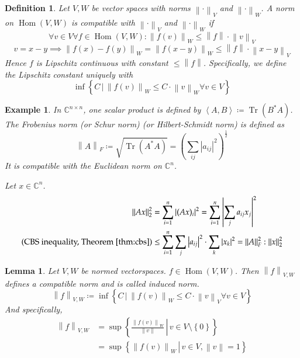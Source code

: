 \documentclass[a4paper]{article}
\newcounter{lecref}[section]
\numberwithin{lecref}{section}
\newtheorem{example}[lecref]{Example}
\newtheorem{definition}[lecref]{Definition}
\newtheorem{lemma}[lecref]{Lemma}
\newcommand{\set}[1]{\left\{#1\right\}}
\newcommand{\setdef}[2]{\left\{\left.#1\,\right|\,#2\right\}}
\newcommand{\angel}[1]{\left\langle#1\right\rangle}
\newcommand{\norm}[1]{\left\|#1\right\|}
\newcommand{\card}[1]{\left|#1\right|}
\begin{document}
\begin{definition} %
  Let $V, W$ be vector spaces with norms $\norm{\cdot}_V$ and $\norm{\cdot}_W$.
  A norm on $\operatorname{Hom}(V, W)$ is \emph{compatible} with $\norm{\cdot}_V$ and $\norm{\cdot}_W$ if
  \[ \forall v \in V \forall f \in \operatorname{Hom}(V, W): \norm{f(v)}_W \leq \norm{f} \cdot \norm{v}_V \]
  \[ v = x - y \implies \norm{f(x) - f(y)}_W = \norm{f(x - y)}_W \leq \norm{f} \cdot \norm{x - y}_V \]
  Hence $f$ is Lipschitz continuous with constant $\leq \norm{f}$.
  Specifically, we define the Lipschitz constant uniquely with
  \[ \inf\setdef{C}{\norm{f(v)}_W \leq C \cdot \norm{v}_W \forall v \in V} \]
\end{definition}

\begin{example}
  In $\mathbb C^{n \times n}$, one scalar product is defined by $\angel{A, B} \coloneqq \operatorname{Tr}(B^* A)$.
  The Frobenius norm (or Schur norm) (or Hilbert-Schmidt norm) is defined as
  \[ \norm{A}_F \coloneqq \sqrt{\operatorname{Tr}(A^* A)} = \left(\sum_{ij} \card{a_{ij}}^2\right)^{\frac12} \]
  It is compatible with the Euclidean norm on $\mathbb C^n$.

  Let $x \in \mathbb C^n$.
  \begin{align*}
    \norm{Ax}_2^2 &= \sum_{i=1}^n \card{(Ax)_i}^2
      = \sum_{i=1}^n \card{\sum_j a_{ij} x_j}^2 \\
    \text{(CBS inequality, Theorem~\ref{thm:cbs})} &\leq \sum_{i=1}^n \sum_j \card{a_{ij}}^2 \cdot \sum_k \card{x_k}^2
      = \norm{A}_F^2 : \norm{x}_2^2
  \end{align*}
\end{example}

\begin{lemma} %
  Let $V, W$ be normed vectorspaces. $f \in \operatorname{Hom}(V, W)$.
  Then $\norm{f}_{V, W}$ defines a compatible norm and is called \emph{induced norm}.
  \[ \norm{f}_{V,W} \coloneqq \inf\setdef{C}{\norm{f(v)}_W \leq C \cdot \norm{v}_V \forall v \in V} \]
  And specifically,
  \begin{align*}
    \norm{f}_{V,W} &= \sup\setdef{\frac{\norm{f(v)}_W}{\norm{v}}}{v \in V \setminus \set{0}} \\
      &= \sup\setdef{\norm{f(v)}_W}{v \in V, \norm{v} = 1} \\
  \end{align*}
\end{lemma}
\end{document}
